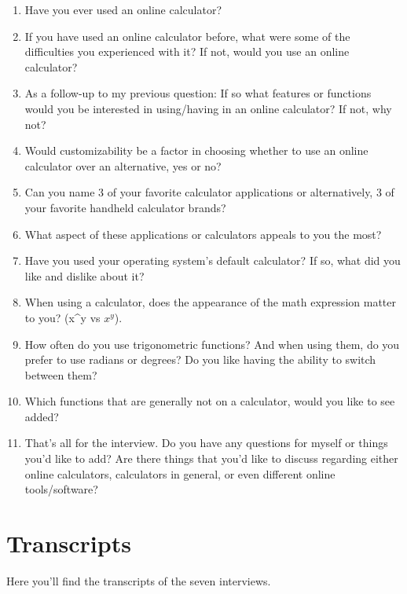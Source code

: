 \documentclass[11pt,onside]{report}
\begin{document}
\begin{enumerate}
\begin{enumerate}
    \end{enumerate}
    \item Have you ever used an online calculator?
    \item If you have used an online calculator before, what were some of the difficulties you experienced with it? If not, would you use an online calculator?
    \item As a follow-up to my previous question: If so what features or functions would you be interested in using/having in an online calculator? If not, why not?
    \item Would customizability be a factor in choosing whether to use an online calculator over an alternative, yes or no?
    \item Can you name 3 of your favorite calculator applications or alternatively, 3 of your favorite handheld calculator brands?
    \item What aspect of these applications or calculators appeals to you the most?
    \item Have you used your operating system’s default calculator? If so, what did you like and dislike about it?
    \item When using a calculator, does the appearance of the math expression matter to you? (x\^{}y vs $x^y$).
    \item How often do you use trigonometric functions? And when using them, do you prefer to use radians or degrees? Do you like having the ability to switch between them?
    \item Which functions that are generally not on a calculator, would you like to see added?
    \item That’s all for the interview. Do you have any questions for myself or things you’d like to add? Are there things that you’d like to discuss regarding either online calculators, calculators in general, or even different online tools/software?
\end{enumerate}

\section{Transcripts}
\begin{description}
    Here you'll find the transcripts of the seven interviews.
\end{description}
\end{document}
